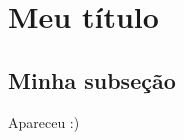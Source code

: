 \documentclass[a4paper, 12pt]{article}
\begin{document}
	

	

	
	\section{Meu título}
	\subsection{Minha subseção}
	
	Apareceu :)
\end{document}
